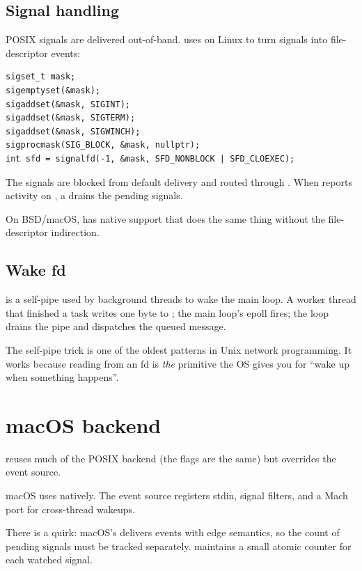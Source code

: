 \subsection*{Signal handling}

POSIX signals are delivered out-of-band. \maya{} uses
 on Linux to turn signals into file-descriptor
events:

\begin{lstlisting}
sigset_t mask;
sigemptyset(&mask);
sigaddset(&mask, SIGINT);
sigaddset(&mask, SIGTERM);
sigaddset(&mask, SIGWINCH);
sigprocmask(SIG_BLOCK, &mask, nullptr);
int sfd = signalfd(-1, &mask, SFD_NONBLOCK | SFD_CLOEXEC);
\end{lstlisting}

The signals are blocked from default delivery and routed
through . When  reports activity on
, a  drains the pending signals.

On BSD/macOS,  has native 
support that does the same thing without the file-descriptor
indirection.

\subsection*{Wake fd}

 is a self-pipe used by background threads to
wake the main loop. A worker thread that finished a task writes
one byte to ; the main loop's epoll fires; the
loop drains the pipe and dispatches the queued message.

\begin{aside}
The self-pipe trick is one of the oldest patterns in Unix
network programming. It works because reading from an fd is
\emph{the} primitive the OS gives you for ``wake up when
something happens''.
\end{aside}

\section{macOS backend}

 reuses much of the
POSIX backend (the  flags are the same) but
overrides the event source.

macOS uses  natively. The event source registers
stdin, signal filters, and a Mach port for cross-thread wakeups.

There is a quirk: macOS's  delivers
 events with edge semantics, so the count
of pending signals must be tracked separately. \maya{}
maintains a small atomic counter for each watched signal.

